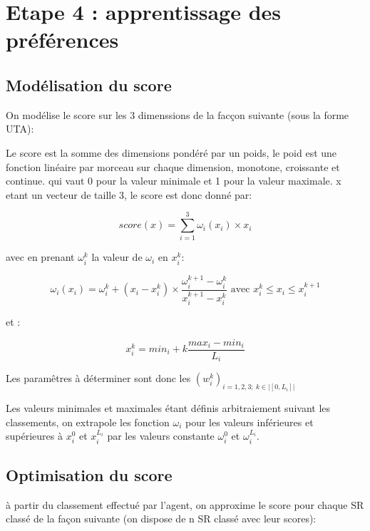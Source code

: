 
\section{Etape 4 : apprentissage des préférences}

\subsection{Modélisation du score}

On modélise le score sur les 3 dimenssions de la facçon suivante (sous la forme UTA):

Le score est la somme des dimensions pondéré par un poids, 
le poid est une fonction linéaire par morceau sur chaque dimension, 
monotone, croissante et continue. qui vaut 0 pour la valeur minimale 
et 1 pour la valeur maximale. x etant un vecteur de taille 3, 
le score est donc donné par:

\begin{equation}
    score(x) = \sum_{i=1}^{3} \omega_i(x_i) \times x_i
\end{equation}

avec en prenant $\omega_i^k$ la valeur de $\omega_i$ en $x_i^k$:

\begin{equation}
    \omega_i(x_i) = \omega_i^k + (x_i - x_i^k) \times \frac{\omega_i^{k+1} - 
    \omega_i^k}{x_i^{k+1} - x_i^k} \text{   avec   } x_i^k \leq x_i \leq x_i^{k+1}
\end{equation}

et :

\begin{equation}
    x_i^k = min_i + k \frac{max_i - min_i}{L_i} 
\end{equation}

Les paramêtres à déterminer sont donc les $(w_i^k)_{i=1,2,3;\ k \in |[0,L_i]|}$


Les valeurs minimales et maximales étant définis arbitraiement suivant les classements, 
on extrapole les fonction $\omega_i$ pour les valeurs inférieures et supérieures à $x_i^0$ 
et $x_i^{L_i}$ par les valeurs constante $\omega_i^0$ et $\omega_i^{L_i}$.

\subsection{Optimisation du score}

à partir du classement effectué par l'agent, on approxime le score pour chaque SR 
classé de la façon suivante (on dispose de n SR classé avec leur scores):

